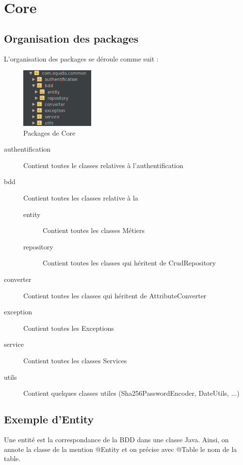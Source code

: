 \chapter{Core}
	\section{Organisation des packages}

		L'organisation des packages se déroule comme suit :

		\begin{figure}[H]
			\centering\includegraphics[width=0.33\textwidth, keepaspectratio]{res/package.png}
			\caption{Packages de Core}
		\end{figure}

		\begin{description}
			\item[authentification]{Contient toutes le classes relatives à l'authentification}
			\item[bdd]{Contient toutes les classes relative à la \bdd{}}

			\begin{description}
				\item[entity]{Contient toutes les classes Métiers}
				\item[repository]{Contient toutes les classes qui héritent de CrudRepository}
			\end{description}

			\item[converter]{Contient toutes les classes qui héritent de AttributeConverter}
			\item[exception]{Contient toutes les Exceptions}
			\item[service]{Contient toutes les classes Services}
			\item[utils]{Contient quelques classes utiles (Sha256PasswordEncoder, DateUtils, ...)}
		\end{description}

	\section{Exemple d'Entity}
		Une entité est la correspondance de la BDD dans une classe Java. \newline
		Ainsi, on annote la classe de la mention @Entity et on précise avec @Table le nom de la table. \newline

